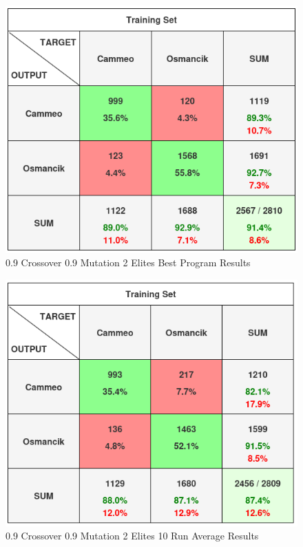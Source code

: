 \documentclass[]{report}
\begin{document}
\begin{figure}[H]
	\centering
	\includegraphics[width=1.0\linewidth]{fp12}
	\caption{0.9 Crossover 0.9 Mutation 2 Elites Best Program Results}
	\label{fig:fp8}
\end{figure}
\begin{figure}[H]
	\centering
	\includegraphics[width=1.0\linewidth]{fp13}
	\caption{0.9 Crossover 0.9 Mutation 2 Elites 10 Run Average Results}
	\label{fig:fp9}
\end{figure}
\end{document}
